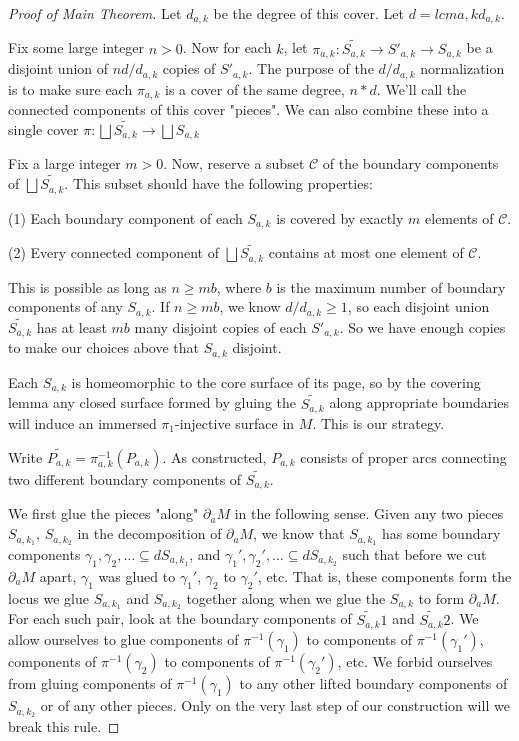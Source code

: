 \documentclass[12pt]{amsart}
\theoremstyle{definition}
\theoremstyle{remark}
\newcommand{\bd}{\partial}
\newcommand{\cin}{\subseteq}
\newcommand{\cC}{\mathcal{C}}
\begin{document}
\begin{proof}[Proof of Main Theorem]
Let $d_{a,k}$ be the degree of this cover. Let $d = lcm a,k d_{a,k}$.

Fix some large integer $n>0$. Now for each $k$, let $\pi_{a,k}
\colon \widetilde{S_{a,k}} \to S'_{a,k} \to S_{a,k}$ be a disjoint union of $nd/d_{a,k}$
copies of $S'_{a,k}$. The purpose of the $d/d_{a,k}$ normalization is to make sure
each $\pi_{a,k}$ is a cover of the same degree, $n*d$.  We'll call the connected
components of this cover "pieces". We can also combine these into a single
cover $\pi \colon \bigsqcup \widetilde{S_{a,k}} \to \bigsqcup S_{a,k}$

Fix a large integer $m>0$. Now, reserve a subset $\cC$ of the boundary
components of $\bigsqcup \widetilde{S_{a,k}}$.  This subset should have the following
properties:

(1) Each boundary component of each $S_{a,k}$ is covered by exactly $m$ elements
of $\cC$.

(2) Every connected component of $\bigsqcup \widetilde{S_{a,k}}$ contains at most one element
of $\cC$.

This is possible as long as $n \geq mb$, where $b$ is the maximum number of
boundary components of any $S_{a,k}$. If $n\geq mb$, we know $d/d_{a,k} \geq
1$, so each disjoint union $\widetilde{S_{a,k}}$ has at least $mb$ many
disjoint copies of each $S'_{a,k}$.  So we have enough copies to make our choices
above that $S_{a,k}$ disjoint.

Each $S_{a,k}$ is homeomorphic to the core surface of its page, so by the covering
lemma any closed surface formed by gluing the $\widetilde{S_{a,k}}$ along appropriate
boundaries will induce an immersed $\pi_1$-injective surface in $M$. This is
our strategy.

Write $\widetilde{P_{a,k}}=\pi_{a,k}^{-1}(P_{a,k})$. As constructed, $P_{a,k}$ consists of proper arcs
connecting two different boundary components of $\widetilde{S_{a,k}}$.

We first glue the pieces "along" $\bd_aM$ in the following sense. Given any two
pieces $S_{a,k_1}$, $S_{a,k_2}$ in the decomposition of $\bd_aM$, we know that
$S_{a,k_1}$ has some boundary components $\gamma_1,\gamma_2,\dots \cin
dS_{a,k_1}$, and $\gamma_1',\gamma_2',\dots \cin dS_{a,k_2}$ such that before we
cut $\bd_aM$ apart, $\gamma_1$ was glued to $\gamma_1'$, $\gamma_2$ to
$\gamma_2'$, etc.  That is, these components form the locus we glue $S_{a,k_1}$
and $S_{a,k_2}$ together along when we glue the $S_{a,k}$ to form $\bd_aM$.  For
each such pair, look at the boundary components of $\widetilde{S_{a,k}}1$ and
$\widetilde{S_{a,k}}2$.  We allow ourselves to glue components of
$\pi^{-1}(\gamma_1)$ to components of $\pi^{-1}(\gamma_1')$, components of
$\pi^{-1}(\gamma_2)$ to components of $\pi^{-1}(\gamma_2')$, etc. We forbid
ourselves from gluing components of $\pi^{-1}(\gamma_1)$ to any other lifted
boundary components of $S_{a,k_2}$ or of any other pieces. Only on the very last
step of our construction will we break this rule.


\end{proof}
\end{document}
